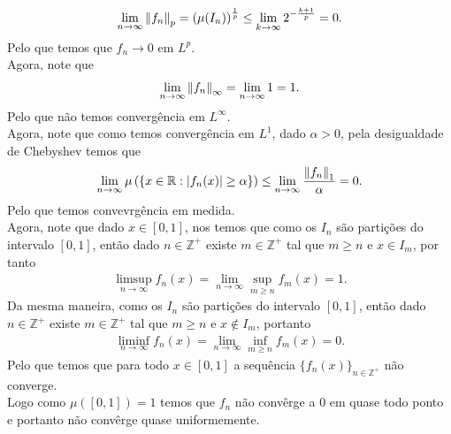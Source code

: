 \begin{homeworkProblem}[6]
\begin{solution}
\begin{enumerate}[a)]
        \begin{align*}
          \lim_{n \to \infty} \left\|f_n\right\|_p=\left( \mu(I_n) \right)^{\frac{1}{p}}\leq \lim_{k \to \infty}2^{-\frac{k+1}{p}}=0.
        \end{align*}
        Pelo que temos que $f_n\to 0$ em $L^{p}$.\\
        Agora, note que
        \begin{align*}
          \lim_{n \to \infty}\left\|f_n\right\|_{\infty}=\lim_{n \to \infty}1=1.
        \end{align*}
        Pelo que não temos convergência em $L^{\infty}$.\\
        Agora, note que como temos convergência em $L^{1}$, dado $\alpha>0$, pela desigualdade de Chebyshev temos que
        \begin{align*}
          \lim_{n \to \infty}\mu\left( \left\{ x\in\mathbb{R}:|f_n(x)|\geq \alpha \right\} \right)\leq \lim_{n \to \infty}\frac{\left\|f_n\right\|_1}{\alpha}=0.
        \end{align*}
        Pelo que temos convevrgência em medida.\\
        Agora, note que dado $x\in [0,1]$, nos temos que como os $I_n$ são partições do intervalo $[0,1]$, então dado $n\in\mathbb{Z}^{+}$ existe $m\in \mathbb{Z}^{+}$ tal que $m\geq n$ e $x\in I_m$, por tanto
        \begin{align*}
          \limsup_{n \to \infty}f_n(x)=\lim_{n \to \infty}\sup_{m\geq n}f_m(x)=1.
        \end{align*}
        Da mesma maneira, como os $I_n$ são partições do intervalo $[0,1]$, então dado $n\in\mathbb{Z}^{+}$ existe $m\in\mathbb{Z}^{+}$ tal que $m\geq n$ e $x\notin I_m$, portanto
        \begin{align*}
          \liminf_{n \to \infty}f_n(x)=\lim_{n \to \infty}\inf_{m\geq n}f_m(x)=0.
        \end{align*}
        Pelo que temos que para todo $x\in [0,1]$ a sequência $\{f_n(x)\}_{n\in\mathbb{Z}^{+}}$ não converge.\\
        Logo como $\mu\left( [0,1] \right)=1$ temos que $f_n$ não convêrge a $0$ em quase todo ponto e portanto não convêrge quase uniformemente. 
    \end{enumerate} 
  \end{solution}
\end{homeworkProblem}

